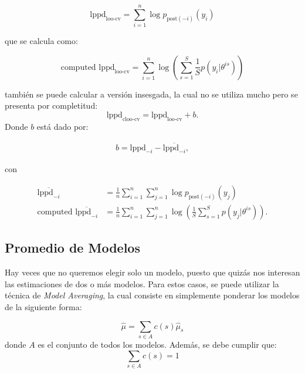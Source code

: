 \begin{itemize}
    \begin{equation}
    \text{lppd}_{\text{loo-cv}} = \sum_{i=1}^n \log p_{\text{post}(-i)}(y_i)
    \end{equation}
    
    que se calcula como:
    
    \begin{equation}
    \text{computed lppd}_{\text{loo-cv}} = \sum_{i=1}^n \log \left( \sum_{s=1}^S \frac{1}{S} p(y_i|\theta^{is})\right)
    \end{equation}
    
    también se puede calcular a versión insesgada, la cual no se utiliza mucho pero se presenta por completitud:
    \begin{equation}
    \text{lppd}_{\text{cloo-cv}} = \text{lppd}_{\text{loo-cv}} + b.
    \end{equation}
    Donde $b$ está dado por:
    
    \begin{align}
    b = \text{lppd}_{-i} - \overline{\text{lppd}_{-i}},
    \end{align}
    
    con 
    
    \begin{align}
    \overline{\text{lppd}_{-i}} & = \frac{1}{n} \sum_{i=1}^n\sum_{j=1}^n \log p_{\text{post}(-i)}(y_j)\\
    \text{computed }\overline{\text{lppd}_{-i}} & = \frac{1}{n} \sum_{i=1}^n\sum_{j=1}^n \log \left( \frac{1}{S}\sum_{s=1}^S p(y_j|\theta^{is})\right).
    \end{align}
    
\end{itemize}

\subsection{Promedio de Modelos}
Hay veces que no queremos elegir solo un modelo, puesto que quizás nos interesan las estimaciones de dos o más modelos. Para estos casos, se puede utilizar la técnica de \emph{Model Averaging}, la cual consiste en simplemente ponderar los modelos de la siguiente forma:

\begin{equation}
\hat{\mu} = \sum_{s\in A} c(s) \hat{\mu}_s
\end{equation}
donde $A$ es el conjunto de todos los modelos. Además, se debe cumplir que:
\begin{equation}
\sum_{s\in A} c(s) = 1
\end{equation}

